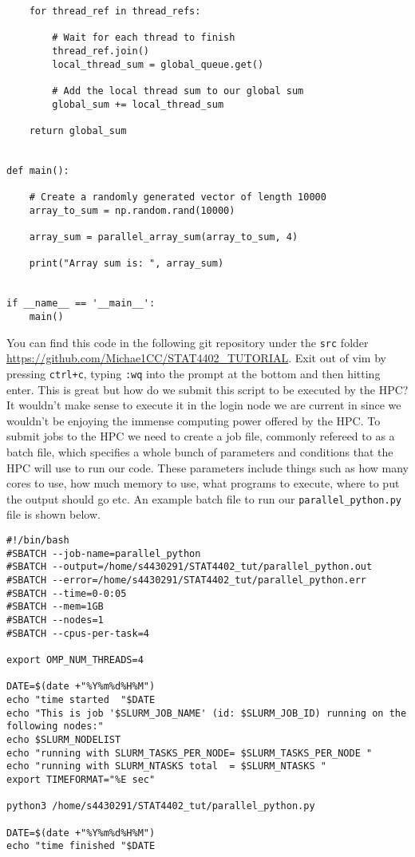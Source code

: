 \begin{verbatim}
    for thread_ref in thread_refs:

        # Wait for each thread to finish
        thread_ref.join()
        local_thread_sum = global_queue.get()

        # Add the local thread sum to our global sum
        global_sum += local_thread_sum

    return global_sum


def main():

    # Create a randomly generated vector of length 10000
    array_to_sum = np.random.rand(10000)

    array_sum = parallel_array_sum(array_to_sum, 4)

    print("Array sum is: ", array_sum)


if __name__ == '__main__':
    main()
\end{verbatim}
You can find this code in the following git repository under the \texttt{src} folder \url{https://github.com/Michae1CC/STAT4402_TUTORIAL}. Exit out of vim by pressing \texttt{ctrl+c}, typing \texttt{:wq} into the prompt at the bottom and then hitting enter. This is great but how do we submit this script to be executed by the HPC? It wouldn't make sense to execute it in the login node we are current in since we wouldn't be enjoying the immense computing power offered by the HPC. To submit jobs to the HPC we need to create a job file, commonly refereed to as a batch file, which specifies a whole bunch of parameters and conditions that the HPC will use to run our code. These parameters include things such as how many cores to use, how much memory to use, what programs to execute, where to put the output should go etc. An example batch file to run our \texttt{parallel\_python.py} file is shown below.
\begin{verbatim}
#!/bin/bash
#SBATCH --job-name=parallel_python
#SBATCH --output=/home/s4430291/STAT4402_tut/parallel_python.out
#SBATCH --error=/home/s4430291/STAT4402_tut/parallel_python.err
#SBATCH --time=0-0:05
#SBATCH --mem=1GB
#SBATCH --nodes=1
#SBATCH --cpus-per-task=4

export OMP_NUM_THREADS=4

DATE=$(date +"%Y%m%d%H%M")
echo "time started  "$DATE
echo "This is job '$SLURM_JOB_NAME' (id: $SLURM_JOB_ID) running on the following nodes:"
echo $SLURM_NODELIST
echo "running with SLURM_TASKS_PER_NODE= $SLURM_TASKS_PER_NODE "
echo "running with SLURM_NTASKS total  = $SLURM_NTASKS "
export TIMEFORMAT="%E sec"

python3 /home/s4430291/STAT4402_tut/parallel_python.py

DATE=$(date +"%Y%m%d%H%M")
echo "time finished "$DATE
\end{verbatim}

